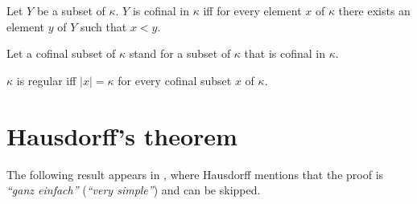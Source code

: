 \documentclass{article}
\begin{document}
  \begin{forthel}
    \begin{definition*}[Cofinality]
      Let $Y$ be a subset of $\kappa$.
      $Y$ is cofinal in $\kappa$ iff for every element $x$ of $\kappa$ there
      exists an element $y$ of $Y$ such that $x < y$.
    \end{definition*}

    Let a cofinal subset of $\kappa$ stand for a subset of $\kappa$ that is
    cofinal in $\kappa$.

    \begin{definition*}
      $\kappa$ is regular iff $|x| = \kappa$ for every cofinal subset $x$ of
      $\kappa$.
    \end{definition*}
  \end{forthel}


  \section{Hausdorff's theorem}

  The following result appears in \cite[p.~443]{Hausdorff1908},
  where Hausdorff mentions that the proof is
  \textit{``ganz einfach''} (\textit{``very simple''}) and can be skipped.
\end{document}
